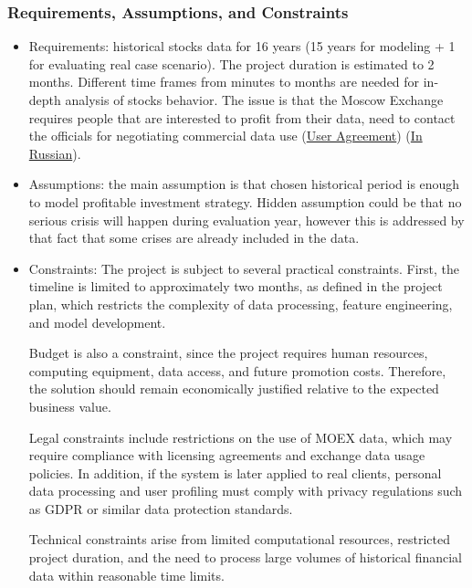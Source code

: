\documentclass[oneside,final,12pt,a4paper]{extreport}
\begin{document}
\subsubsection{Requirements, Assumptions, and Constraints}
\begin{itemize}
    \item Requirements: historical stocks data for 16 years (15 years for modeling + 1 for evaluating real case scenario). The project duration is estimated to 2 months. Different time frames from minutes to months are needed for in-depth analysis of stocks behavior. The issue is that the Moscow Exchange requires people that are interested to profit from their data, need to contact the officials for negotiating commercial data use (\href{https://www.moex.com/a7156#:~:text=4.3.,by%20the%20Exchange%20and%20Users.}{User Agreement}) (\href{https://www.moex.com/a2193#:~:text=%D0%9F%D1%80%D0%BE%D0%B3%D1%80%D0%B0%D0%BC%D0%BC%D0%BD%D1%8B%D0%B9%20%D0%B8%D0%BD%D1%82%D0%B5%D1%80%D1%84%D0%B5%D0%B9%D1%81%20%D0%BA%20%D0%98%D0%A1%D0%A1,%D1%81%D0%B5%D1%80%D0%B2%D0%B5%D1%80%D0%BE%D0%BC%20%D0%BE%D1%81%D1%83%D1%89%D0%B5%D1%81%D1%82%D0%B2%D0%BB%D1%8F%D0%B5%D1%82%D1%81%D1%8F%20%D0%BF%D0%BE%20%D0%BF%D1%80%D0%BE%D1%82%D0%BE%D0%BA%D0%BE%D0%BB%D1%83%20http.&text=%D0%9D%D0%B0%20Python%20%D0%B8%20Visual%20Basic,NET.}{In Russian}).
    \item Assumptions: the main assumption is that chosen historical period is enough to model profitable investment strategy. Hidden assumption could be that no serious crisis will happen during evaluation year, however this is addressed by that fact that some crises are already included in the data.
    \item Constraints: The project is subject to several practical constraints. First, the timeline is limited to approximately two months, as defined in the project plan, which restricts the complexity of data processing, feature engineering, and model development. 

    Budget is also a constraint, since the project requires human resources, computing equipment, data access, and future promotion costs. Therefore, the solution should remain economically justified relative to the expected business value.
    
    Legal constraints include restrictions on the use of MOEX data, which may require compliance with licensing agreements and exchange data usage policies. In addition, if the system is later applied to real clients, personal data processing and user profiling must comply with privacy regulations such as GDPR or similar data protection standards.
    
    Technical constraints arise from limited computational resources, restricted project duration, and the need to process large volumes of historical financial data within reasonable time limits.
\end{itemize}
\end{document}
